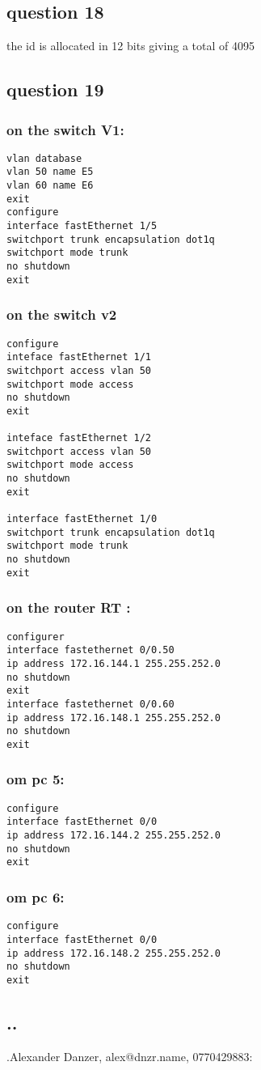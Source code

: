 \documentclass[11pt]{article}
\begin{document}
\subsection{question 18}
\label{sec:orgheadline38}
the id is allocated in 12 bits giving a total of 4095


\subsection{question 19}
\label{sec:orgheadline44}
\subsubsection{on the switch V1:}
\label{sec:orgheadline39}
\begin{verbatim}
vlan database
vlan 50 name E5
vlan 60 name E6
exit
configure
interface fastEthernet 1/5
switchport trunk encapsulation dot1q
switchport mode trunk
no shutdown
exit
\end{verbatim}

\subsubsection{on the switch v2}
\label{sec:orgheadline40}
\begin{verbatim}
configure
inteface fastEthernet 1/1
switchport access vlan 50
switchport mode access
no shutdown
exit

inteface fastEthernet 1/2
switchport access vlan 50
switchport mode access
no shutdown
exit

interface fastEthernet 1/0
switchport trunk encapsulation dot1q
switchport mode trunk
no shutdown
exit
\end{verbatim}


\subsubsection{on the router RT :}
\label{sec:orgheadline41}
\begin{verbatim}
configurer
interface fastethernet 0/0.50
ip address 172.16.144.1 255.255.252.0
no shutdown
exit
interface fastethernet 0/0.60
ip address 172.16.148.1 255.255.252.0
no shutdown
exit
\end{verbatim}


\subsubsection{om pc 5:}
\label{sec:orgheadline42}
\begin{verbatim}
configure
interface fastEthernet 0/0
ip address 172.16.144.2 255.255.252.0
no shutdown
exit
\end{verbatim}


\subsubsection{om pc 6:}
\label{sec:orgheadline43}
\begin{verbatim}
configure
interface fastEthernet 0/0
ip address 172.16.148.2 255.255.252.0
no shutdown
exit
\end{verbatim}



\subsection{..}
\label{sec:orgheadline45}
.Alexander Danzer, alex@dnzr.name, 0770429883:
\end{document}
